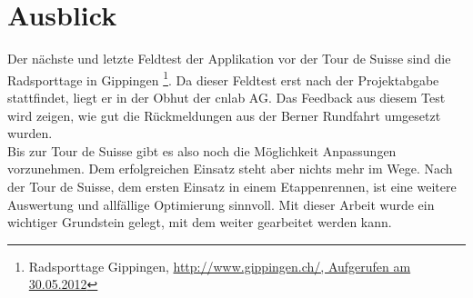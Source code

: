 \section{Ausblick}
Der nächste und letzte Feldtest der Applikation vor der Tour de Suisse sind die Radsporttage in Gippingen \footnote{Radsporttage Gippingen, \url{http://www.gippingen.ch/, Aufgerufen am 30.05.2012}}. Da dieser Feldtest erst nach der Projektabgabe stattfindet, liegt er in der Obhut der cnlab AG. Das Feedback aus diesem Test wird zeigen, wie gut die Rückmeldungen aus der Berner Rundfahrt umgesetzt wurden.
\\
Bis zur Tour de Suisse gibt es also noch die Möglichkeit Anpassungen vorzunehmen. Dem erfolgreichen Einsatz steht aber nichts mehr im Wege. Nach der Tour de Suisse, dem ersten Einsatz in einem Etappenrennen, ist eine weitere Auswertung und allfällige Optimierung sinnvoll. Mit dieser Arbeit wurde ein wichtiger Grundstein gelegt, mit dem weiter gearbeitet werden kann.